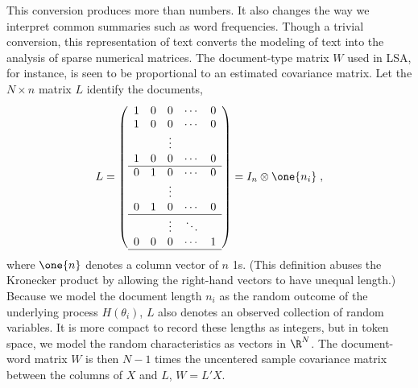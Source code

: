 \documentclass[12pt]{article}
\begin{document}
 This conversion produces more than numbers.  It also changes the way we
 interpret common summaries such as word frequencies. Though a trivial
 conversion, this representation of text converts the modeling of text into the analysis of
 sparse numerical matrices.  The document-type
 matrix $W$ used in LSA, for instance, is seen to be proportional to an estimated
 covariance matrix.  Let the $N \times n$ matrix $L$ identify the documents,
\begin{equation}
  L =  \left(  
           \begin{array}{ccccc}
            1  & 0 & 0 & \cdots & 0 \cr
            1  & 0 & 0 & \cdots & 0 \cr
             &&  \vdots &&                       \cr
            1 & 0 &  0 & \cdots & 0 \cr \hline
            0 & 1 & 0  & \cdots & 0 \cr
              &&  \vdots &&                        \cr
            0 & 1& 0 & \cdots & 0 \cr \hline
              &&  \vdots  &\ddots&             \cr
            0 & 0& 0 & \cdots & 1 \cr \hline        
           \end{array}
         \right) = I_n \otimes \one{n_i}  \;,
\end{equation}
where $\one{n}$ denotes a column vector of $n$ 1s. (This definition abuses the Kronecker product by allowing the right-hand vectors to have unequal length.)  Because we model the document length $n_i$ as the random outcome of the underlying process $H(\theta_i)$, $L$ also denotes an observed collection of random variables.  It is more compact to record these lengths as integers, but in token space, we model the random characteristics as vectors in $\R^{N}$.  The document-word matrix $W$ is then $N-1$ times the uncentered sample covariance matrix between the columns of $X$ and $L$, $W =  L'X$.
\end{document}
